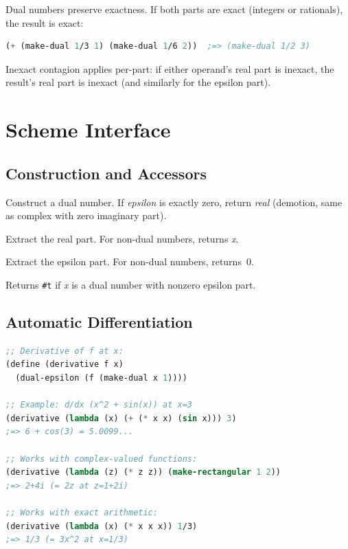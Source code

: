 \documentclass[12pt]{report}
\begin{document}
Dual numbers preserve exactness.  If both parts are exact
(integers or rationals), the result is exact:
\begin{lstlisting}[language=Scheme]
(+ (make-dual 1/3 1) (make-dual 1/6 2))  ;=> (make-dual 1/2 3)
\end{lstlisting}
Inexact contagion applies per-part: if either operand's real part
is inexact, the result's real part is inexact (and similarly for
the epsilon part).

\chapter{Scheme Interface}

\section{Construction and Accessors}

\begin{description}[style=nextline]
\item[\tt (make-dual \textit{real} \textit{epsilon})]
  Construct a dual number.  If \textit{epsilon} is exactly zero,
  return \textit{real} (demotion, same as complex with zero
  imaginary part).

\item[\tt (dual-real \textit{x})]
  Extract the real part.  For non-dual numbers, returns \textit{x}.

\item[\tt (dual-epsilon \textit{x})]
  Extract the epsilon part.  For non-dual numbers, returns~0.

\item[\tt (dual? \textit{x})]
  Returns {\tt \#t} if \textit{x} is a dual number with nonzero
  epsilon part.
\end{description}

\section{Automatic Differentiation}

\begin{lstlisting}[language=Scheme]
;; Derivative of f at x:
(define (derivative f x)
  (dual-epsilon (f (make-dual x 1))))

;; Example: d/dx (x^2 + sin(x)) at x=3
(derivative (lambda (x) (+ (* x x) (sin x))) 3)
;=> 6 + cos(3) = 5.0099...

;; Works with complex-valued functions:
(derivative (lambda (z) (* z z)) (make-rectangular 1 2))
;=> 2+4i (= 2z at z=1+2i)

;; Works with exact arithmetic:
(derivative (lambda (x) (* x x x)) 1/3)
;=> 1/3 (= 3x^2 at x=1/3)
\end{lstlisting}
\end{document}
